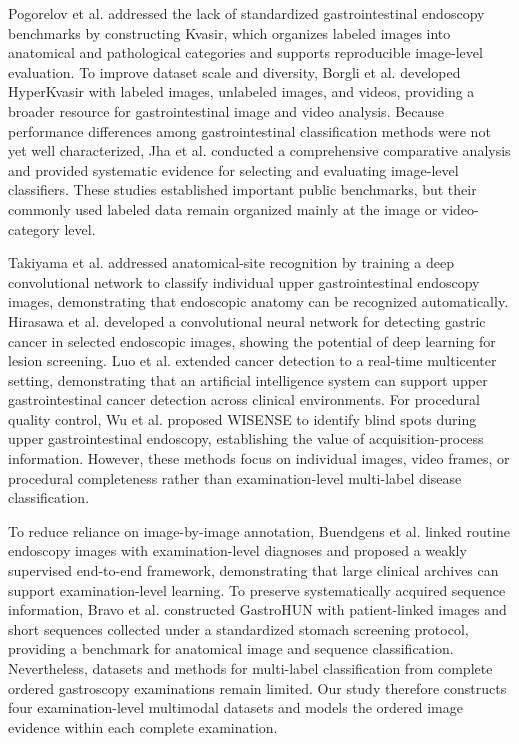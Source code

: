 \documentclass[Afour,sagev,times]{sagej}
\begin{document}
Pogorelov et al. addressed the lack of standardized gastrointestinal endoscopy benchmarks by constructing Kvasir, which organizes labeled images into anatomical and pathological categories and supports reproducible image-level evaluation.\cite{R1} To improve dataset scale and diversity, Borgli et al. developed HyperKvasir with labeled images, unlabeled images, and videos, providing a broader resource for gastrointestinal image and video analysis.\cite{R2} Because performance differences among gastrointestinal classification methods were not yet well characterized, Jha et al. conducted a comprehensive comparative analysis and provided systematic evidence for selecting and evaluating image-level classifiers.\cite{R3} These studies established important public benchmarks, but their commonly used labeled data remain organized mainly at the image or video-category level.

Takiyama et al. addressed anatomical-site recognition by training a deep convolutional network to classify individual upper gastrointestinal endoscopy images, demonstrating that endoscopic anatomy can be recognized automatically.\cite{R4} Hirasawa et al. developed a convolutional neural network for detecting gastric cancer in selected endoscopic images, showing the potential of deep learning for lesion screening.\cite{R5} Luo et al. extended cancer detection to a real-time multicenter setting, demonstrating that an artificial intelligence system can support upper gastrointestinal cancer detection across clinical environments.\cite{R6} For procedural quality control, Wu et al. proposed WISENSE to identify blind spots during upper gastrointestinal endoscopy, establishing the value of acquisition-process information.\cite{R7} However, these methods focus on individual images, video frames, or procedural completeness rather than examination-level multi-label disease classification.

To reduce reliance on image-by-image annotation, Buendgens et al. linked routine endoscopy images with examination-level diagnoses and proposed a weakly supervised end-to-end framework, demonstrating that large clinical archives can support examination-level learning.\cite{R8} To preserve systematically acquired sequence information, Bravo et al. constructed GastroHUN with patient-linked images and short sequences collected under a standardized stomach screening protocol, providing a benchmark for anatomical image and sequence classification.\cite{R9} Nevertheless, datasets and methods for multi-label classification from complete ordered gastroscopy examinations remain limited. Our study therefore constructs four examination-level multimodal datasets and models the ordered image evidence within each complete examination.
\end{document}
